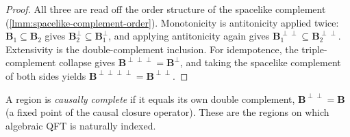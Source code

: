 \begin{proof}
    \leanok
    All three are read off the order structure of the spacelike complement (\ref{lmm:spacelike-complement-order}). Monotonicity is antitonicity applied twice: $\mathbf{B}_1 \subseteq \mathbf{B}_2$ gives $\mathbf{B}_2^{\perp} \subseteq \mathbf{B}_1^{\perp}$, and applying antitonicity again gives $\mathbf{B}_1^{\perp\perp} \subseteq \mathbf{B}_2^{\perp\perp}$. Extensivity is the double-complement inclusion. For idempotence, the triple-complement collapse gives $\mathbf{B}^{\perp\perp\perp} = \mathbf{B}^{\perp}$, and taking the spacelike complement of both sides yields $\mathbf{B}^{\perp\perp\perp\perp} = \mathbf{B}^{\perp\perp}$.
\end{proof}

\medskip

\begin{definition}
    \label{def:causally-complete-region}
    \leanok
    A region is \emph{causally complete} if it equals its own double complement, $\mathbf{B}^{\perp\perp} = \mathbf{B}$ (a fixed point of the causal closure operator). These are the regions on which algebraic QFT is naturally indexed.
\end{definition}

\medskip

